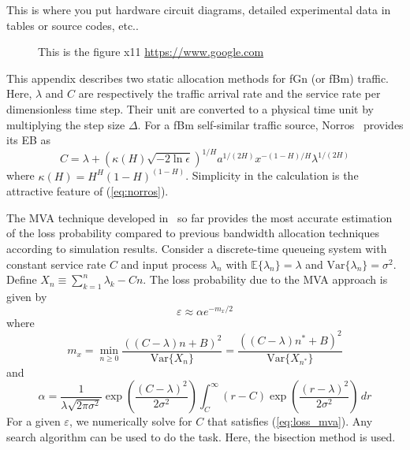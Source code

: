 \documentclass[12pt,oneside,openright,a4paper]{cpe-english-project}
\begin{document}
This is where you put hardware circuit diagrams, detailed experimental data in tables or source codes, etc.. \\ \bigskip

 \begin{figure}[!h]
\caption{This is the figure x11 \href{https://www.google.com} {https://www.google.com}}\label{fig:x1}
\end{figure}

This appendix describes two static allocation methods for fGn (or fBm)
traffic. Here, $\lambda$ and $C$ are respectively the traffic arrival
rate and the service rate per dimensionless time step. Their unit are
converted to a physical time unit by multiplying the step size
$\Delta$. For a fBm self-similar traffic source,
Norros~\cite{norros95} provides its EB as
\begin{equation}\label{eq:norros}
  C = \lambda + (\kappa(H)\sqrt{-2\ln\epsilon})^{1/H}a^{1/(2H)}x^{-(1-H)/H}\lambda^{1/(2H)}
\end{equation}
where $\kappa(H) = H^H(1-H)^{(1-H)}$. Simplicity in the calculation is
the attractive feature of (\ref{eq:norros}).

The MVA technique developed in~\cite{kim01} so far provides the most
accurate estimation of the loss probability compared to previous
bandwidth allocation techniques according to simulation results.
Consider a discrete-time queueing system with constant service rate
$C$ and input process $\lambda_n$ with $\mathbb{E}\{\lambda_n\} =
\lambda$ and $\mathrm{Var}\{\lambda_n\} = \sigma^2$.  Define $X_n \equiv
\sum_{k=1}^n \lambda_k - Cn$.  The loss probability due to the MVA
approach is given by
\begin{equation}\label{eq:loss_mva}
  \varepsilon \approx \alpha e^{-m_x/2}
\end{equation}
where
\begin{equation}\label{eq:mx}
m_x = \min_{n \geq 0} \frac{((C-\lambda)n + B)^2}{\mathrm{Var}\{X_n\}} =
\frac{((C-\lambda)n^\ast + B)^2}{\mathrm{Var}\{X_{n^{\ast}}\}}
\end{equation} 
and 
\begin{equation}\label{eq:alpha}
  \alpha =
  \frac{1}{\lambda\sqrt{2\pi\sigma^2}}\exp\left(\frac{(C-\lambda)^2}{2\sigma^2}\right)
  \int_C^\infty (r-C)\exp\left(\frac{(r-\lambda)^2}{2\sigma^2}\right)\, dr
\end{equation}
For a given $\varepsilon$, we numerically solve for $C$ that satisfies
(\ref{eq:loss_mva}). Any search algorithm can be used to do the task.
Here, the bisection method is used.  
\end{document}
